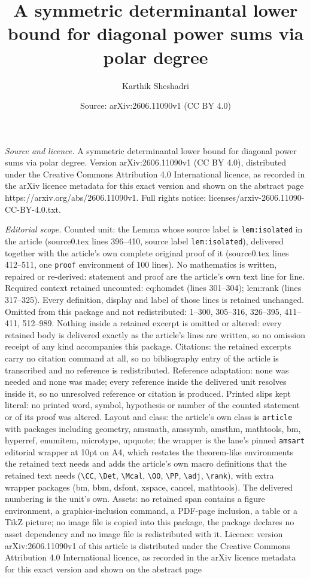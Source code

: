 \documentclass[10pt,a4paper]{amsart}
\title[A symmetric determinantal lower bound for diagonal power sum]{A symmetric determinantal lower bound for diagonal power sums via polar degree}
\author{Karthik Sheshadri}
\date{Source: arXiv:2606.11090v1 (CC BY 4.0)}
\begin{document}
\maketitle

\noindent\emph{Source and licence.} A symmetric determinantal lower bound for diagonal power sums via polar degree. Version arXiv:2606.11090v1 (CC BY 4.0), distributed under the Creative Commons Attribution 4.0 International licence, as recorded in the arXiv licence metadata for this exact version and shown on the abstract page https://arxiv.org/abs/2606.11090v1. Full rights notice: licenses/arxiv-2606.11090-CC-BY-4.0.txt.\par\smallskip

\noindent\textit{Editorial scope.} Counted unit: the Lemma whose source label is \texttt{lem:isolated} in the article (source0.tex lines 396--410, source label \texttt{lem:isolated}), delivered together with the article's own complete original proof of it (source0.tex lines 412--511, one \texttt{proof} environment of 100 lines). No mathematics is written, repaired or re-derived: statement and proof are the article's own text line for line. Required context retained uncounted: eq:homdet (lines 301--304); lem:rank (lines 317--325). Every definition, display and label of those lines is retained unchanged. Omitted from this package and not redistributed: 1--300, 305--316, 326--395, 411--411, 512--989. Nothing inside a retained excerpt is omitted or altered: every retained body is delivered exactly as the article's lines are written, so no omission receipt of any kind accompanies this package. Citations: the retained excerpts carry no citation command at all, so no bibliography entry of the article is transcribed and no reference is redistributed. Reference adaptation: none was needed and none was made; every reference inside the delivered unit resolves inside it, so no unresolved reference or citation is produced. Printed slips kept literal: no printed word, symbol, hypothesis or number of the counted statement or of its proof was altered. Layout and class: the article's own class is \texttt{article} with packages including geometry, amsmath, amssymb, amsthm, mathtools, bm, hyperref, enumitem, microtype, upquote; the wrapper is the lane's pinned \texttt{amsart} editorial wrapper at 10pt on A4, which restates the theorem-like environments the retained text needs and adds the article's own macro definitions that the retained text needs (\texttt{\textbackslash CC}, \texttt{\textbackslash Det}, \texttt{\textbackslash Mcal}, \texttt{\textbackslash OO}, \texttt{\textbackslash PP}, \texttt{\textbackslash adj}, \texttt{\textbackslash rank}), with extra wrapper packages (bm, bbm, dsfont, xspace, cancel, mathtools). The delivered numbering is the unit's own. Assets: no retained span contains a figure environment, a graphics-inclusion command, a PDF-page inclusion, a table or a TikZ picture; no image file is copied into this package, the package declares no asset dependency and no image file is redistributed with it. Licence: version arXiv:2606.11090v1 of this article is distributed under the Creative Commons Attribution 4.0 International licence, as recorded in the arXiv licence metadata for this exact version and shown on the abstract page 
\end{document}
